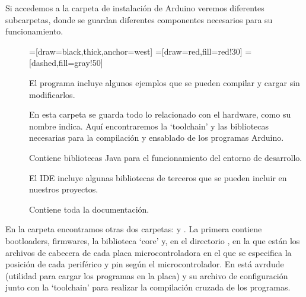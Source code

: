 Si accedemos a la carpeta de instalación de Arduino veremos diferentes subcarpetas, donde se guardan diferentes componentes necesarios para su funcionamiento.
\begin{figure}[H]
\begin{center}
=[draw=black,thick,anchor=west]
=[draw=red,fill=red!30]
=[dashed,fill=gray!50]
\end{center}
\end{figure}
\label{arduino_carpetas}
\begin{description}
    \item[] El programa incluye algunos ejemplos que se pueden compilar y cargar sin modificarlos. 
    \item[] En esta carpeta se guarda todo lo relacionado con el hardware, como su nombre indica. Aquí encontraremos la `toolchain' y las bibliotecas necesarias para la compilación y ensablado de los programas Arduino.
    \item[] Contiene bibliotecas Java para el funcionamiento del entorno de desarrollo.
			\item[] El IDE incluye algunas bibliotecas de terceros que se pueden incluir en nuestros proyectos.
			\item[] Contiene toda la documentación.
\end{description}

En la carpeta  encontramos otras dos carpetas:  y .  La primera contiene bootloaders, firmwares, la biblioteca `core' y, en el directorio , en la que están los archivos de cabecera de cada placa microcontroladora en el que se especifica la posición de cada periférico y pin según el microcontrolador.  En  está avrdude (utilidad para cargar los programas en la placa) y su archivo de configuración junto con la `toolchain'  para realizar la compilación cruzada de los programas.

